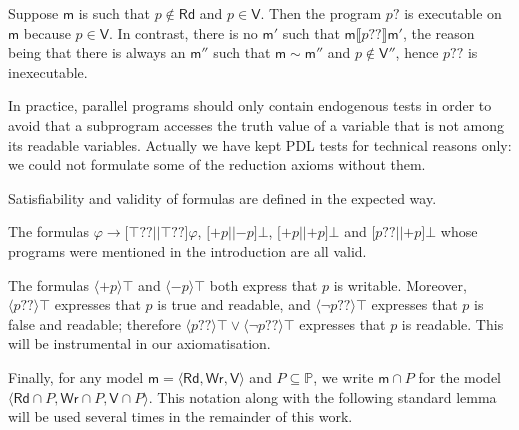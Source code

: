\documentclass{llncs}
\newcommand{\modl}{\mathsf m}
\newcommand{\pll}{ {||} }							%
\newcommand{\readset}{\mathsf{Rd}}
\newcommand{\valuset}{\mathsf{V}}
\newcommand{\writeset}{\mathsf{Wr}}
\newcommand{\testendo}{?\!\!?}			%
\newcommand{\testpdl}{?}				%
\newcommand{\assgntopV}[1]{{\mathtt {+} #1}}
\newcommand{\assgnbotV}[1]{{\mathtt {-} #1}}
\newcommand{\intPgm}[1]{\llbracket #1 \rrbracket}
\newcommand{\lbox}[1]{ \big[ #1 \big] }
\newcommand{\ldia}[1]{ \big\langle #1 \big\rangle}
\newcommand{\limp}{ \rightarrow }
\newcommand{\ndet}{\,{\cup}\,}
\renewcommand{\phi}{\varphi}
\newcommand{\propset}{\mathbb P}
\newcommand{\modinter}{\cap}
\newcommand{\tuple}[1]{ \langle #1 \rangle}
\begin{document}
\begin{example}
Suppose $\modl$ is such that $p \notin \readset$ and $p \in \valuset$. 
Then the program $p \testpdl$ is executable on $\modl$ because $p \in \valuset$.
In contrast, there is no $\modl'$ such that $\modl \intPgm{ p \testendo } \modl'$, 
the reason being that there is always an $\modl''$ such that $\modl \sim \modl''$ and $p \notin \valuset''$,
hence $p \testendo$ is inexecutable. %
\end{example}

In practice, parallel programs should only contain endogenous tests in order to avoid that a subprogram accesses the truth value of a variable that is not among its readable variables.
Actually we have kept PDL tests for technical reasons only:
we could not formulate some of the reduction axioms without them. 

Satisfiability and validity of formulas are defined in the expected way.

\begin{example}
The formulas 
$\phi \limp \lbox{ \top \testendo \pll \top \testendo } \phi$, 
$\lbox{ \assgntopV p \pll \assgnbotV p } \bot$,
$\lbox{ \assgntopV p \pll \assgntopV p } \bot$ and 
$\lbox{ p \testendo \pll \assgntopV p } \bot$ 
whose programs were mentioned in the introduction are all valid. 
\end{example}

The formulas $\ldia{ \assgntopV p } \top $ and $\ldia{ \assgnbotV p } \top $ both express that $p$ is writable. 
Moreover, $\ldia{ p \testendo} \top $ expresses that $p$ is true and readable, and 
$\ldia{ \lnot p \testendo} \top $ expresses that $p$ is false and readable;
therefore $\ldia{ p \testendo} \top \lor \ldia{ \lnot p \testendo} \top $ 
expresses that $p$ is readable. 
This will be instrumental in our axiomatisation. 

Finally, for any model $\modl = \tuple{\readset, \writeset, \valuset}$ and $P \subseteq \propset$, we write
$\modl \modinter P$ for the model $\tuple{\readset \cap P, \writeset \cap P, \valuset \cap P}$.
This notation along with the following standard lemma
will be used several times in the remainder of this work.
\end{document}
